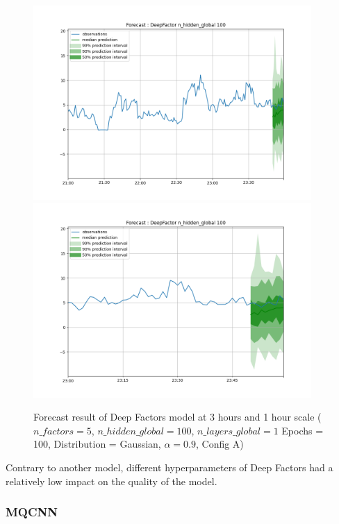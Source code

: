 \begin{figure}[H]
    \centering
    \includegraphics[width=400px]{plots/forecast/a/DeepFactor/n_hidden_global/100/180.png}
    \includegraphics[width=400px]{plots/forecast/a/DeepFactor/n_hidden_global/100/60.png}
    \caption{Forecast result of Deep Factors model at 3 hours and 1 hour scale ($n\_factors = 5$, $n\_hidden\_global = 100$, $n\_layers\_global = 1$ Epochs = 100, Distribution = Gaussian, $\alpha = 0.9$, Config A)}
    \label{fig:comp_deepfactor_n_hidden_global}
\end{figure}

Contrary to another model, different hyperparameters of Deep Factors had a relatively low impact on the quality of the model.

\subsubsection{MQCNN} \label{comp_mqcnn}

